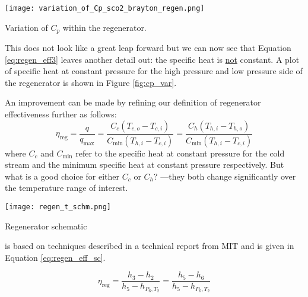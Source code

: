 \begin{marginfigure}
\texttt{[image: variation\_of\_Cp\_sco2\_brayton\_regen.png]}
\caption{Variation of $C_p$ within the regenerator.}
\label{fig:cp_var}
\end{marginfigure}

This does not look like a great leap forward but we can now see that Equation \ref{eq:regen_eff3} leaves another detail out: the specific heat is \underline{not} constant.  A plot of specific heat at constant pressure for the high pressure and low pressure side of the regenerator is shown in Figure \ref{fig:cp_var}. 

An improvement can be made by refining our definition of regenerator effectiveness further\cite{bergman2011introduction} as follows:
\begin{equation}
\eta_{\text{reg}}=\frac{q}{q_{\text{max}}}=\frac{C_c(T_{c,o}-T_{c,i})}{C_\text{min}(T_{h,i}-T_{c,i})} = \frac{C_h(T_{h,i}-T_{h,o})}{C_\text{min}(T_{h,i}-T_{c,i})}
\label{eq:regen_eff4}
\end{equation}
where $C_c$ and $C_{\text{min}}$ refer to the specific heat at constant pressure for the cold stream and the minimum specific heat at constant pressure respectively.  But what is a good choice for either $C_c$ or $C_h$? ---they both change significantly over the temperature range of interest.
\begin{marginfigure}
\texttt{[image: regen\_t\_schm.png]}
\caption{Regenerator schematic}
\label{fig:regen_t_schm}
\end{marginfigure}

 is based on techniques described in a technical report from MIT\cite{dostal2004supercritical} and is given in Equation \ref{eq:regen_eff_sc}.

\begin{equation}
\eta_{\text{reg}} = \frac{h_3 - h_2}{h_5 - h_{P_6,T_2}} = \frac{h_5 - h_6}{h_5 - h_{P_6,T_2}}
\label{eq:regen_eff_sc}
\end{equation}

